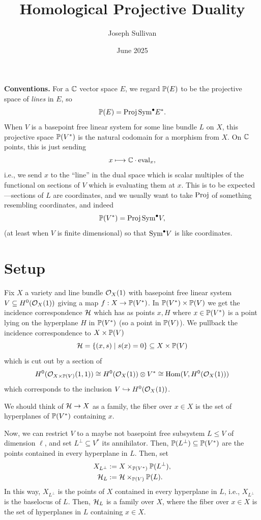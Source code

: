 \documentclass[12pt]{article}
\title{Homological Projective Duality}
\author{Joseph Sullivan}
\date{June 2025}
\begin{document}
\maketitle

\textbf{Conventions.} For a $\C$ vector space $E$, we regard $\P(E)$ to be the projective space of \textit{lines} in $E$, so
\[\P(E) = \Proj \Sym^\bullet E^*.\]
When $V$ is a basepoint free linear system for some line bundle $L$ on $X$, this projective space $\P(V^*)$ is the natural codomain for a morphism from $X$. On $\C$ points, this is just sending
\[x \longmapsto \C \cdot \eval_x,\]
i.e., we send $x$ to the ``line'' in the dual space which is scalar multiples of the functional on sections of $V$ which is evaluating them at $x$. This is to be expected---sections of $L$ are coordinates, and we usually want to take $\Proj$ of something resembling coordinates, and indeed
\[\P(V^*) = \Proj \Sym^\bullet V,\]
(at least when $V$ is finite dimensional) so that $\Sym^\bullet V$ is like coordinates.

\section{Setup}

Fix $X$ a variety and line bundle $\cO_X(1)$ with basepoint free linear system $V\subseteq H^0(\cO_X(1))$ giving a map $f: X\to \P(V^*)$. In $\P(V^*) \times \P(V)$ we get the incidence correspondence $\cH$ which has as points $x,H$ where $x\in \P(V^*)$ is a point lying on the hyperplane $H$ in $\P(V^*)$ (so a point in $\P(V)$). We pullback the incidence correspondence to $X\times \P(V)$
\[\cH = \{(x,s) \mid s(x)=0\} \subseteq X\times \P(V)\]
which is cut out by a section of
\[H^0(\cO_{X\times \P(V)}(1,1)) \cong H^0(\cO_X(1)) \otimes V^* \cong \Hom(V,H^0(\cO_X(1)))\]
which corresponds to the inclusion $V\hookrightarrow H^0(\cO_X(1))$.

We should think of $\cH \to X$ as a family, the fiber over $x\in X$ is the set of hyperplanes of $\P(V^*)$ containing $x$.

Now, we can restrict $V$ to a maybe not basepoint free subsystem $L\leq V$ of dimension $\ell$, and set $L^\perp \subseteq V^*$ its annihilator. Then, $\P(L^\perp)\subseteq \P(V^*)$ are the points contained in every hyperplane in $L$. Then, set
\begin{align*}
    X_{L^\perp} &\defeq X \times_{\P(V^*)} \P(L^\perp),\\
    \cH_L &\defeq \cH \times_{\P(V)} \P(L).
\end{align*}
In this way, $X_{L^\perp}$ is the points of $X$ contained in every hyperplane in $L$, i.e., $X_{L^\perp}$ is the baselocus of $L$. Then, $\cH_L$ is a family over $X$, where the fiber over $x\in X$ is the set of hyperplanes in $L$ containing $x\in X$.
\end{document}
